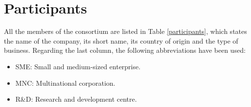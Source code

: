 \section{Participants}

All the members of the consortium are listed in Table \ref{participants}, which states the name of the company, its short name, its country of origin and the type of business. Regarding the last column, the following abbreviations have been used:

\begin{itemize}
	\item SME: Small and medium-sized enterprise.
	\item MNC: Multinational corporation.
	\item R\&D: Research and development centre.
\end{itemize} 

